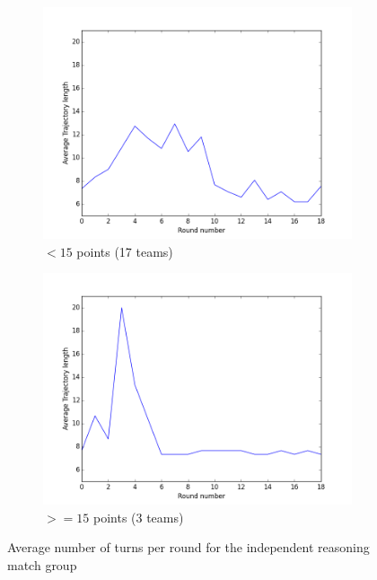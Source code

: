 \begin{figure}
\centering
\begin{subfigure}{.5\textwidth}
\centering
\includegraphics[width=\columnwidth]{figures/lengths_uncoordinated_rest.png}
\caption{$< 15$ points (17 teams)}
\label{fig:lengths_uncoordinated_rest}
\end{subfigure}%
\begin{subfigure}{.5\textwidth}
\centering
\includegraphics[width=\columnwidth]{figures/lengths_uncoordinated_15.png}
\caption{$>= 15$ points (3 teams)}
\label{fig:lengths_uncoordinated_15}
\end{subfigure}
\caption{Average number of turns per round for the independent reasoning match group}
\label{fig:lengths_uncoordinated}
\end{figure}

